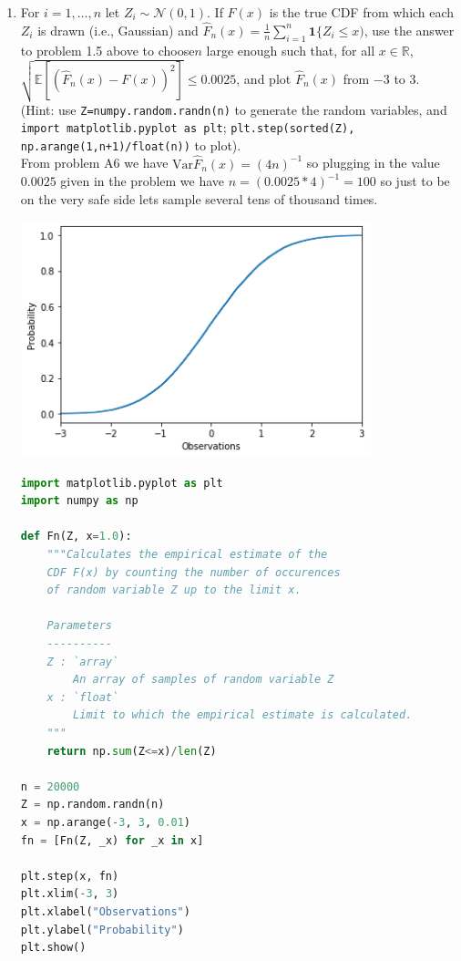 \documentclass{article}
\newcommand{\field}[1]{\mathbb{#1}}
\newcommand{\1}{\mathbf{1}}
\newcommand{\E}{\mathbb{E}}
\newcommand{\R}{\field{R}} %
\begin{document}
\begin{enumerate}
\item For $i=1,\dots,n$ let $Z_i \sim \mathcal{N}(0,1)$. If $F(x)$ is the true CDF from which each $Z_i$ is drawn (i.e., Gaussian) and $\widehat{F}_n(x) = \frac{1}{n} \sum_{i=1}^n \1\{ Z_i \leq x)$, use the answer to problem 1.5 above to choose$n$ large enough such that, for all $x \in \R$, $ \sqrt{\E[(\widehat{F}_n(x)-F(x))^2 ]} \leq 0.0025$, and plot $\widehat{F}_n(x)$ from $-3$ to $3$. \\(Hint: use \texttt{Z=numpy.random.randn(n)} to generate the random variables, and \texttt{import matplotlib.pyplot as plt}; \texttt{plt.step(sorted(Z), np.arange(1,n+1)/float(n))} to plot). \\
From problem A6 we have $\text{Var}\widehat F_n(x) = (4n)^{-1}$ so plugging in the value $0.0025$ given in the problem we have $n=(0.0025*4)^{-1}=100$ so just to be on the very safe side lets sample several tens of thousand times. 
    \begin{center}
    \includegraphics[width=4in]{HW0_plots/cumdist1.png}
    \end{center} 
    \begin{lstlisting}[language=Python]
import matplotlib.pyplot as plt
import numpy as np

def Fn(Z, x=1.0):
    """Calculates the empirical estimate of the
    CDF F(x) by counting the number of occurences
    of random variable Z up to the limit x. 
    
    Parameters
    ----------
    Z : `array`
        An array of samples of random variable Z
    x : `float`
        Limit to which the empirical estimate is calculated.
    """
    return np.sum(Z<=x)/len(Z)

n = 20000
Z = np.random.randn(n)
x = np.arange(-3, 3, 0.01)
fn = [Fn(Z, _x) for _x in x]

plt.step(x, fn)
plt.xlim(-3, 3)
plt.xlabel("Observations")
plt.ylabel("Probability")
plt.show()
    \end{lstlisting}
    

\end{enumerate}
\end{document}

